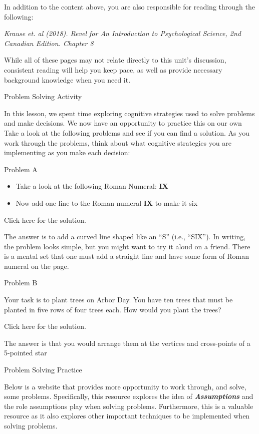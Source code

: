 \documentclass[
]{book}
\providecommand{\tightlist}{%
  \setlength{\itemsep}{0pt}\setlength{\parskip}{0pt}}
\begin{document}
\begin{reflect}
In addition to the content above, you are also responsible for reading through the following:

\emph{Krause et. al (2018). Revel for An Introduction to Psychological Science, 2nd Canadian Edition. Chapter 8}

While all of these pages may not relate directly to this unit's discussion, consistent reading will help you keep pace, as well as provide necessary background knowledge when you need it.

{Problem Solving Activity}

In this lesson, we spent time exploring cognitive strategies used to solve problems and make decisions. We now have an opportunity to practice this on our own Take a look at the following problems and see if you can find a solution. As you work through the problems, think about what cognitive strategies you are implementing as you make each decision:

{Problem A}

\begin{itemize}
\tightlist
\item
  Take a look at the following Roman Numeral: \textbf{IX}
\item
  Now add one line to the Roman numeral \textbf{IX} to make it six
\end{itemize}

Click here for the solution.

The answer is to add a curved line shaped like an ``S'' (i.e., ``SIX''). In writing, the problem looks simple, but you might want to try it aloud on a friend. There is a mental set that one must add a straight line and have some form of Roman numeral on the page.

{Problem B}

Your task is to plant trees on Arbor Day. You have ten trees that must be planted in five rows of four trees each. How would you plant the trees?

Click here for the solution.

The answer is that you would arrange them at the vertices and cross-points of a 5-pointed star

{Problem Solving Practice}

Below is a website that provides more opportunity to work through, and solve, some problems. Specifically, this resource explores the idea of \textbf{\emph{Assumptions}} and the role assumptions play when solving problems. Furthermore, this is a valuable resource as it also explores other important techniques to be implemented when solving problems.


\end{reflect}
\end{document}
